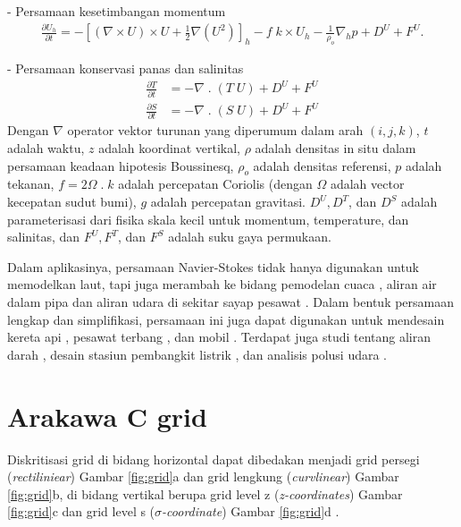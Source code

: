 \begin{spacing}{1.5}
	- Persamaan kesetimbangan momentum
	\begin{equation}
		\begin{aligned}
			\frac{\partial U_h}{\partial t} = - \left[(\nabla \times U) \times U + \frac{1}{2}\nabla (U^2)\right]_h - f \; k \times U_h - \frac{1}{\rho_o}\nabla_h p + D^U + F^U.
		\end{aligned}
	\end{equation}

	- Persamaan konservasi panas dan salinitas
	\begin{equation}
		\begin{aligned}
			\frac{\partial T}{\partial t} &= - \nabla \; . \; (T\;U)  + D^U + F^U \\
			\frac{\partial S}{\partial t} &= - \nabla \; . \; (S\;U)  + D^U + F^U
		\end{aligned}
	\end{equation}
	Dengan $\nabla$ operator vektor turunan yang diperumum dalam arah $(i,j,k)$, $t$ adalah waktu, $z$ adalah koordinat vertikal, $\rho$ adalah densitas in situ dalam persamaan keadaan hipotesis Boussinesq, $\rho_o$ adalah densitas referensi, $p$ adalah tekanan, $f = 2\Omega\; . \;k$ adalah percepatan Coriolis (dengan $\Omega$ adalah vector kecepatan sudut bumi), $g$ adalah percepatan gravitasi. $D^U, D^T$, dan $D^S$ adalah parameterisasi dari fisika skala kecil  untuk momentum, temperature, dan salinitas, dan $F^U,F^T$, dan $F^S$ adalah suku gaya permukaan.
	 
	Dalam aplikasinya, persamaan Navier-Stokes tidak hanya digunakan untuk memodelkan laut, tapi juga merambah ke bidang pemodelan cuaca , aliran air dalam pipa  dan aliran udara di sekitar sayap pesawat . Dalam bentuk persamaan lengkap dan simplifikasi, persamaan ini juga dapat digunakan untuk mendesain kereta api , pesawat terbang , dan mobil . Terdapat juga studi tentang aliran darah , desain stasiun pembangkit listrik , dan analisis polusi udara . 

\section[Arakawa C grid]{Arakawa C grid}
	Diskritisasi grid di bidang horizontal dapat dibedakan menjadi grid persegi (\textit{rectiliniear}) Gambar \ref{fig:grid}a dan grid lengkung (\textit{curvlinear}) Gambar \ref{fig:grid}b, di bidang vertikal berupa grid level z (\textit{z-coordinates}) Gambar \ref{fig:grid}c dan grid level s (\textit{$\sigma$-coordinate}) Gambar \ref{fig:grid}d .
	

\end{spacing}

